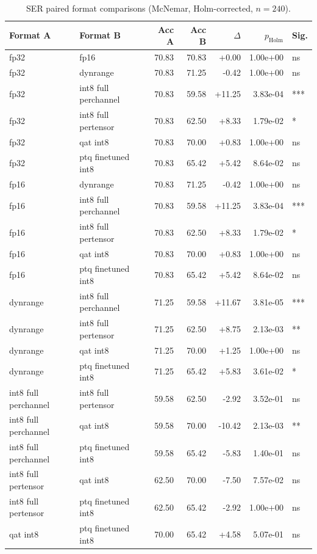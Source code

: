 \begin{table}[htbp]\centering
\caption{SER paired format comparisons (McNemar, Holm-corrected, $n=240$).}
\begin{tabular}{llrrrrl}
\hline
Format A & Format B & Acc A & Acc B & $\Delta$ & $p_{\mathrm{Holm}}$ & Sig. \\
\hline
fp32 & fp16 & 70.83 & 70.83 & +0.00 & 1.00e+00 & ns \\
fp32 & dynrange & 70.83 & 71.25 & -0.42 & 1.00e+00 & ns \\
fp32 & int8 full perchannel & 70.83 & 59.58 & +11.25 & 3.83e-04 & *** \\
fp32 & int8 full pertensor & 70.83 & 62.50 & +8.33 & 1.79e-02 & * \\
fp32 & qat int8 & 70.83 & 70.00 & +0.83 & 1.00e+00 & ns \\
fp32 & ptq finetuned int8 & 70.83 & 65.42 & +5.42 & 8.64e-02 & ns \\
fp16 & dynrange & 70.83 & 71.25 & -0.42 & 1.00e+00 & ns \\
fp16 & int8 full perchannel & 70.83 & 59.58 & +11.25 & 3.83e-04 & *** \\
fp16 & int8 full pertensor & 70.83 & 62.50 & +8.33 & 1.79e-02 & * \\
fp16 & qat int8 & 70.83 & 70.00 & +0.83 & 1.00e+00 & ns \\
fp16 & ptq finetuned int8 & 70.83 & 65.42 & +5.42 & 8.64e-02 & ns \\
dynrange & int8 full perchannel & 71.25 & 59.58 & +11.67 & 3.81e-05 & *** \\
dynrange & int8 full pertensor & 71.25 & 62.50 & +8.75 & 2.13e-03 & ** \\
dynrange & qat int8 & 71.25 & 70.00 & +1.25 & 1.00e+00 & ns \\
dynrange & ptq finetuned int8 & 71.25 & 65.42 & +5.83 & 3.61e-02 & * \\
int8 full perchannel & int8 full pertensor & 59.58 & 62.50 & -2.92 & 3.52e-01 & ns \\
int8 full perchannel & qat int8 & 59.58 & 70.00 & -10.42 & 2.13e-03 & ** \\
int8 full perchannel & ptq finetuned int8 & 59.58 & 65.42 & -5.83 & 1.40e-01 & ns \\
int8 full pertensor & qat int8 & 62.50 & 70.00 & -7.50 & 7.57e-02 & ns \\
int8 full pertensor & ptq finetuned int8 & 62.50 & 65.42 & -2.92 & 1.00e+00 & ns \\
qat int8 & ptq finetuned int8 & 70.00 & 65.42 & +4.58 & 5.07e-01 & ns \\
\hline
\end{tabular}
\end{table}

